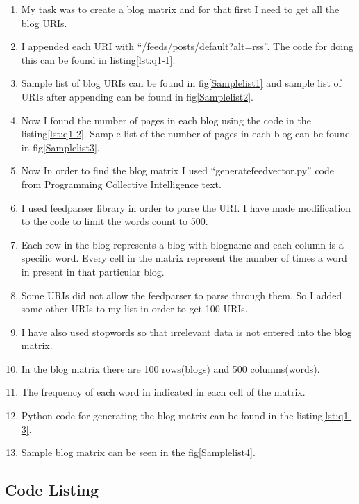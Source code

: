\begin{enumerate}
\item My task was to create a blog matrix and for that first I need to get all the blog URIs. 
\item I appended each URI with ``/feeds/posts/default?alt=rss''. The code for doing this can be found in listing\ref{lst:q1-1}.
\item Sample list of blog URIs can be found in fig\ref{Samplelist1} and sample list of URIs after appending can be found in fig\ref{Samplelist2}.
\item Now I found the number of pages in each blog using the code in the listing\ref{lst:q1-2}. Sample list of the number of pages in each blog can be found in fig\ref{Samplelist3}.
\item Now In order to find the blog matrix I used ``generatefeedvector.py'' code from Programming Collective Intelligence text.
\item I used feedparser library in order to parse the URI. I have made modification to the code to limit the words count to 500.
\item Each row in the blog represents a blog with blogname and each column is a specific word. Every cell in the matrix represent the number of times a word in present in that particular blog.
\item Some URIs did not allow the feedparser to parse through them. So I added some other URIs to my list in order to get 100 URIs.
\item I have also used stopwords so that irrelevant data is not entered into the blog matrix.
\item In the blog matrix there are 100 rows(blogs) and 500 columns(words). 
\item The frequency of each word in indicated in each cell of the matrix.
\item Python code for generating the blog matrix can be found in the listing\ref{lst:q1-3}.
\item Sample blog matrix can be seen in the fig\ref{Samplelist4}.
\end{enumerate}
\newpage
\subsection{Code Listing}


\newpage

